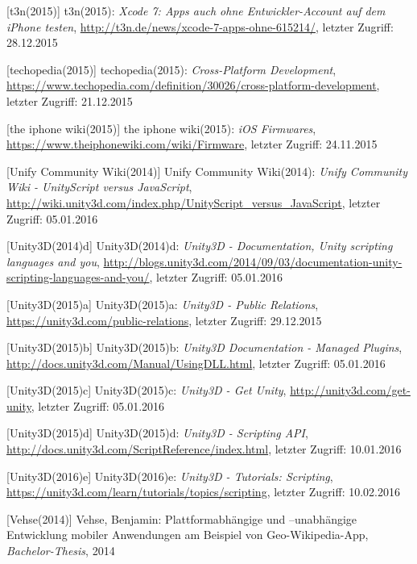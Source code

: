 \begin{thebibliography}{}
[t3n(2015)] t3n(2015): \emph{Xcode 7: Apps auch ohne Entwickler-Account auf dem iPhone testen},
\url{http://t3n.de/news/xcode-7-apps-ohne-615214/}, letzter Zugriff: 28.12.2015

[techopedia(2015)] techopedia(2015): \emph{Cross-Platform Development},
\url{https://www.techopedia.com/definition/30026/cross-platform-development}, letzter Zugriff: 21.12.2015

[the iphone wiki(2015)] the iphone wiki(2015): \emph{iOS Firmwares},
\url{https://www.theiphonewiki.com/wiki/Firmware}, letzter Zugriff: 24.11.2015

[Unify Community Wiki(2014)] Unify Community Wiki(2014): \emph{Unify Community Wiki - UnityScript versus JavaScript},
\url{http://wiki.unity3d.com/index.php/UnityScript_versus_JavaScript}, letzter Zugriff: 05.01.2016

[Unity3D(2014)d] Unity3D(2014)d: \emph{Unity3D - Documentation, Unity scripting languages and you},
\url{http://blogs.unity3d.com/2014/09/03/documentation-unity-scripting-languages-and-you/}, letzter Zugriff: 05.01.2016

[Unity3D(2015)a] Unity3D(2015)a: \emph{Unity3D - Public Relations},
\url{https://unity3d.com/public-relations}, letzter Zugriff: 29.12.2015

[Unity3D(2015)b] Unity3D(2015)b: \emph{Unity3D Documentation - Managed Plugins},
\url{http://docs.unity3d.com/Manual/UsingDLL.html}, letzter Zugriff: 05.01.2016

[Unity3D(2015)c] Unity3D(2015)c: \emph{Unity3D - Get Unity},
\url{http://unity3d.com/get-unity}, letzter Zugriff: 05.01.2016

[Unity3D(2015)d] Unity3D(2015)d: \emph{Unity3D - Scripting API},
\url{http://docs.unity3d.com/ScriptReference/index.html}, letzter Zugriff: 10.01.2016

[Unity3D(2016)e] Unity3D(2016)e: \emph{Unity3D - Tutorials: Scripting},
\url{https://unity3d.com/learn/tutorials/topics/scripting}, letzter Zugriff: 10.02.2016

[Vehse(2014)] Vehse, Benjamin:
\glqq Plattformabhängige und –unabhängige
Entwicklung mobiler Anwendungen am
Beispiel von Geo-Wikipedia-App\grqq, 
\emph{Bachelor-Thesis}, 2014


\end{thebibliography}
